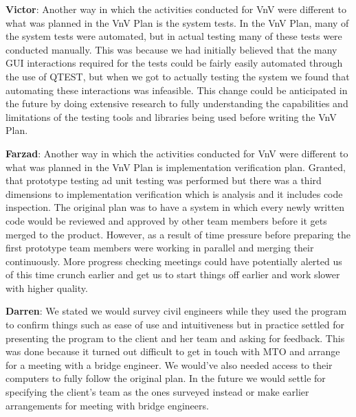 \documentclass[12pt, titlepage]{article}
\begin{document}
\textbf{Victor}: Another way in which the activities conducted for VnV were different to what was planned in the VnV Plan is the system tests. In the VnV Plan, many of the system tests were automated, but in actual testing many of these tests were conducted manually. This was because we had initially believed that the many GUI interactions required for the tests could be fairly easily automated through the use of QTEST, but when we got to actually testing the system we found that automating these interactions was infeasible. This change could be anticipated in the future by doing extensive research to fully understanding the capabilities and limitations of the testing tools and libraries being used before writing the VnV Plan.

\textbf{Farzad}: Another way in which the activities conducted for VnV were different to what was planned in the VnV Plan is implementation verification plan. Granted, that prototype testing ad unit testing was performed but there was a third dimensions to implementation verification which is analysis and it includes code inspection. The original plan was to have a system in which every newly written code would be reviewed and approved by other team members before it gets merged to the product. However, as a result of time pressure before preparing the first prototype team members were working in parallel and merging their continuously. More progress checking meetings could have potentially alerted us of this time crunch earlier and get us to start things off earlier and work slower with higher quality.

\textbf{Darren}: We stated we would survey civil engineers while they used the program to confirm things such as ease of use and intuitiveness but in practice settled for presenting the program to the client and her team and asking for feedback. This was done because it turned out difficult to get in touch with MTO and arrange for a meeting with a bridge engineer. We would've also needed access to their computers to fully follow the original plan. In the future we would settle for specifying the client's team as the ones surveyed instead or make earlier arrangements for meeting with bridge engineers.
\end{document}
